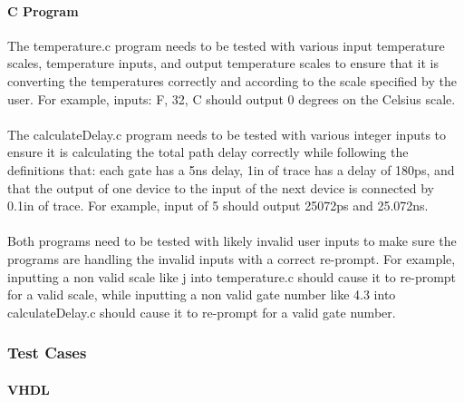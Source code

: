 \documentclass{article}
\begin{document}
  \paragraph{C Program} The temperature.c program needs to be tested with various input temperature scales, temperature inputs, and output temperature scales to ensure that it is converting the temperatures correctly and according to the scale specified by the user. For example, inputs: F, 32, C should output 0 degrees on the Celsius scale. 

  \paragraph{} The calculateDelay.c program needs to be tested with various integer inputs to ensure it is calculating the total path delay correctly while following the definitions  that: each gate has a 5ns delay, 1in of trace has a delay of 180ps, and that the output of one device to the input of the next device is connected by 0.1in of trace.  For example, input of 5 should output 25072ps and 25.072ns. 

  \paragraph{} Both programs need to be tested with likely invalid user inputs to make sure the programs are handling the invalid inputs with a correct re-prompt. For example, inputting a non valid scale like j into temperature.c should cause it to re-prompt for a valid scale, while inputting a non valid gate number like 4.3 into calculateDelay.c should cause it to re-prompt for a valid gate number.


  \subsubsection{Test Cases}
  \paragraph{VHDL}
\end{document}
